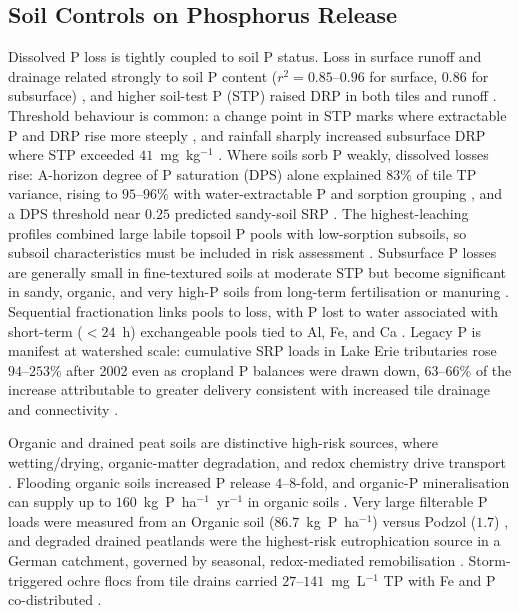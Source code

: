 \subsection{Soil Controls on Phosphorus Release}

Dissolved P loss is tightly coupled to soil P status. Loss in surface runoff
and drainage related strongly to soil P content
($r^2 = 0.85$--$0.96$ for surface, $0.86$ for subsurface)
\parencite{Sharpley1995}, and higher soil-test P (STP) raised DRP in both
tiles and runoff \parencite{Osterholz2020}. Threshold behaviour is common: a
change point in STP marks where extractable P and DRP rise more steeply
\parencite{McDowell2001b}, and rainfall sharply increased subsurface DRP
where STP exceeded $41$~mg~kg$^{-1}$ \parencite{Ni2020}. Where soils sorb P
weakly, dissolved losses rise: A-horizon degree of P saturation (DPS) alone
explained $83\%$ of tile TP variance, rising to $95$--$96\%$ with
water-extractable P and sorption grouping \parencite{Beauchemin2003}, and a
DPS threshold near $0.25$ predicted sandy-soil SRP \parencite{Siemens2004}.
The highest-leaching profiles combined large labile topsoil P pools with
low-sorption subsoils, so subsoil characteristics must be included in
risk assessment \parencite{Liu2024b}. Subsurface P losses are generally
small in fine-textured soils at moderate STP but become significant in
sandy, organic, and very high-P soils from long-term fertilisation or
manuring \parencite{Sims1998}. Sequential fractionation links pools to loss,
with P lost to water associated with short-term ($<24$~h) exchangeable pools
tied to Al, Fe, and Ca \parencite{McDowell2001}. Legacy P is manifest at
watershed scale: cumulative SRP loads in Lake Erie tributaries rose
$94$--$253\%$ after 2002 even as cropland P balances were drawn down,
$63$--$66\%$ of the increase attributable to greater delivery consistent
with increased tile drainage and connectivity \parencite{Jarvie2017}.

Organic and drained peat soils are distinctive high-risk sources, where
wetting/drying, organic-matter degradation, and redox chemistry drive
transport \parencite{Grenon2021}. Flooding organic soils increased P release
$4$--$8$-fold, and organic-P mineralisation can supply up to
$160$~kg~P~ha$^{-1}$~yr$^{-1}$ in organic soils \parencite{Sharpley1995}.
Very large filterable P loads were measured from an Organic soil
($86.7$~kg~P~ha$^{-1}$) versus Podzol ($1.7$) \parencite{McDowell2015b}, and
degraded drained peatlands were the highest-risk eutrophication source in a
German catchment, governed by seasonal, redox-mediated remobilisation
\parencite{Tiemeyer2009,YliHalla2022}. Storm-triggered ochre flocs from tile
drains carried $27$--$141$~mg~L$^{-1}$ TP with Fe and P co-distributed
\parencite{Zimmer2016}.

